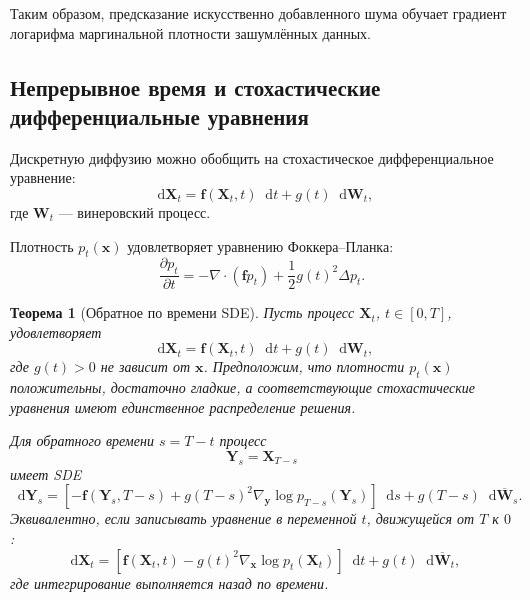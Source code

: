 \documentclass[12pt,a4paper]{article}
\newtheorem{theorem}{Теорема}[section]
\theoremstyle{definition}
\newcommand{\dd}{\mathop{}\!\mathrm{d}}
\newcommand{\1}{\mathbf{1}}
\begin{document}
Таким образом, предсказание искусственно добавленного шума обучает
градиент логарифма маргинальной плотности зашумлённых данных.

\subsection{Непрерывное время и стохастические дифференциальные
уравнения}

Дискретную диффузию можно обобщить на стохастическое
дифференциальное уравнение:
\[
    \dd\bm{X}_t
    =
    \bm{f}(\bm{X}_t,t)\dd t
    +
    g(t)\dd\bm{W}_t,
\]
где $\bm{W}_t$ --- винеровский процесс.

Плотность $p_t(\bm{x})$ удовлетворяет уравнению Фоккера--Планка:
\[
    \frac{\partial p_t}{\partial t}
    =
    -
    \nabla\cdot(\bm{f}p_t)
    +
    \frac{1}{2}g(t)^2\Delta p_t.
\]

\begin{theorem}[Обратное по времени SDE]
Пусть процесс $\bm{X}_t$, $t\in[0,T]$, удовлетворяет
\[
    \dd\bm{X}_t
    =
    \bm{f}(\bm{X}_t,t)\dd t
    +
    g(t)\dd\bm{W}_t,
\]
где $g(t)>0$ не зависит от $\bm{x}$. Предположим, что плотности
$p_t(\bm{x})$ положительны, достаточно гладкие, а соответствующие
стохастические уравнения имеют единственное распределение решения.

Для обратного времени $s=T-t$ процесс
\[
    \bm{Y}_s=\bm{X}_{T-s}
\]
имеет SDE
\[
    \dd\bm{Y}_s
    =
    \left[
        -\bm{f}(\bm{Y}_s,T-s)
        +
        g(T-s)^2
        \nabla_{\bm{y}}\log p_{T-s}(\bm{Y}_s)
    \right]\dd s
    +
    g(T-s)\dd\overline{\bm{W}}_s.
\]
Эквивалентно, если записывать уравнение в переменной $t$, движущейся
от $T$ к $0$:
\[
    \dd\bm{X}_t
    =
    \left[
        \bm{f}(\bm{X}_t,t)
        -
        g(t)^2\nabla_{\bm{x}}\log p_t(\bm{X}_t)
    \right]\dd t
    +
    g(t)\dd\overline{\bm{W}}_t,
\]
где интегрирование выполняется назад по времени.
\end{theorem}
\end{document}
